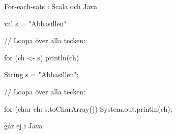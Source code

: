 \begin{Slide}{For-each-sats i Scala och Java}
\begin{multicols}{2}
\begin{CodeSmall}[basicstyle=\ttfamily\SlideFontSize{6}{8}]
val s = "Abbasillen"

// Loopa över alla tecken:

for (ch <- s) {
  println(ch)
}
\end{CodeSmall}

\columnbreak

\begin{CodeSmall}[language=Java,basicstyle=\ttfamily\SlideFontSize{6}{8}]
String s = "Abbasillen";

// Loopa över alla tecken:

for (char ch: s.toCharArray()) {
  System.out.println(ch);
}
\end{CodeSmall}
\end{multicols}

\pause{} går ej i Java
\end{Slide}





